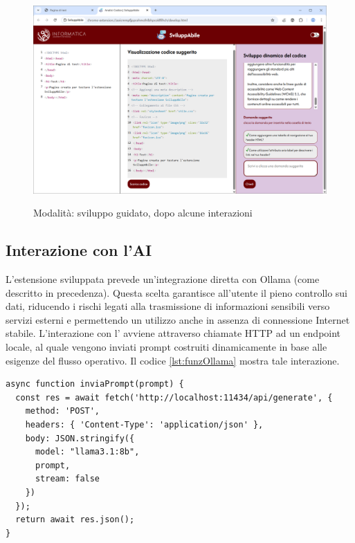 \begin{figure}[H]
    \centering
    \includegraphics[width=1\linewidth, alt={Modalità di sviluppo guidato, dopo un'interazione}]{img/mg2.png}
    \caption{Modalità: sviluppo guidato, dopo alcune interazioni}\label{fig:mg2}
\end{figure}

\subsection{Interazione con l'AI}
\noindent L’estensione sviluppata prevede un’integrazione diretta con Ollama (come descritto in precedenza). Questa scelta garantisce all’utente il pieno controllo sui dati, riducendo i rischi legati alla trasmissione di informazioni sensibili verso servizi esterni e permettendo un utilizzo anche in assenza di connessione Internet stabile. L’interazione con l’ avviene attraverso chiamate HTTP ad un endpoint locale, al quale vengono inviati prompt costruiti dinamicamente in base alle esigenze del flusso operativo. Il codice \ref{lst:funzOllama} mostra tale interazione.

\begin{lstlisting}[style=jsStyle, caption={Funzione di interazione con Ollama}, label={lst:funzOllama}]
async function inviaPrompt(prompt) {
  const res = await fetch('http://localhost:11434/api/generate', {
    method: 'POST',
    headers: { 'Content-Type': 'application/json' },
    body: JSON.stringify({
      model: "llama3.1:8b",
      prompt,
      stream: false
    })
  });
  return await res.json();
}
\end{lstlisting}

